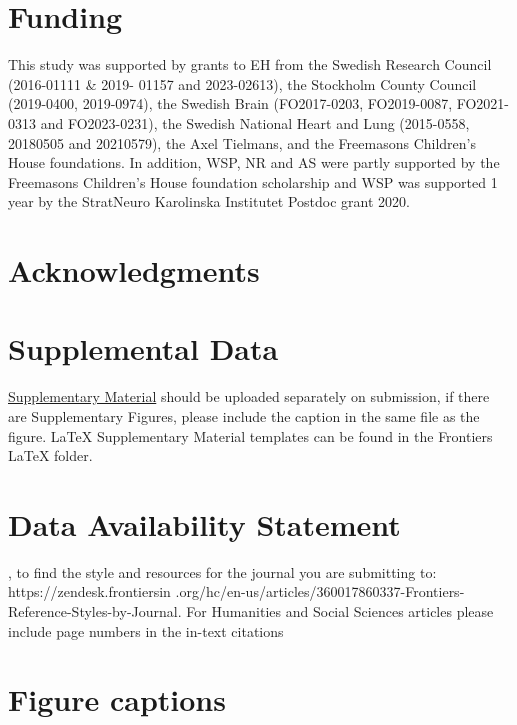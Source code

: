 \documentclass[utf8]{FrontiersinHarvard}
\begin{document}
    \section*{Funding}
    This study was supported by grants to EH from the Swedish Research Council (2016-01111 \& 2019-
    01157 and 2023-02613), the Stockholm County Council (2019-0400, 2019-0974), the Swedish Brain
    (FO2017-0203, FO2019-0087, FO2021-0313 and FO2023-0231), the Swedish National Heart and Lung (2015-0558, 20180505
    and 20210579), the Axel Tielmans, and the Freemasons Children’s House foundations.
    In addition, WSP, NR and AS were partly supported by the Freemasons Children’s House foundation scholarship and
    WSP was supported 1 year by the StratNeuro Karolinska Institutet Postdoc grant 2020.


    \section*{Acknowledgments}

    \section*{Supplemental Data}
    \href{http://home.frontiersin.org/about/author-guidelines#SupplementaryMaterial}{Supplementary Material} should
    be uploaded separately on submission, if there are Supplementary Figures, please include the caption in the same
    file as the figure. LaTeX Supplementary Material templates can be found in the Frontiers LaTeX folder.

    \section*{Data Availability Statement}

    , to find the style and resources for the journal you are submitting to: https://zendesk.frontiersin
    .org/hc/en-us/articles/360017860337-Frontiers-Reference-Styles-by-Journal. For Humanities and Social Sciences
    articles please include page numbers in the in-text citations
    

    \section*{Figure captions}
    
\end{document}

